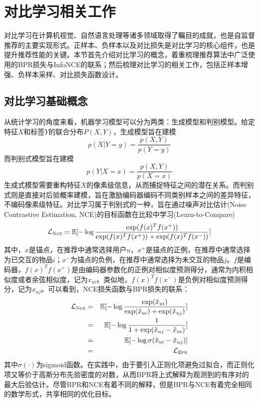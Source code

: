 \section{对比学习相关工作}
对比学习在计算机视觉、自然语言处理等诸多领域取得了瞩目的成就，也是自监督推荐的主要实现形式\cite{SSR:2023:TKDE}。正样本、负样本以及对比损失是对比学习的核心组件，也是提升推荐性能的关键。本节首先介绍对比学习的概念，着重梳理推荐算法中广泛使用的BPR损失与InfoNCE的联系；然后梳理对比学习的相关工作，包括正样本增强、负样本采样、对比损失函数设计。
\subsection{对比学习基础概念}
从统计学习的角度来看，机器学习模型可以分为两类：生成模型和判别模型\cite{li:2019}。给定特征$X$和标签$Y$的联合分布$P(X,Y)$，生成模型旨在建模
\[p(X|Y=y)= \frac{p(X,Y)}{p(Y=y)}\]
而判别式模型旨在建模
\[p(Y|X=x)= \frac{p(X,Y)}{p(X=x)}\]
生成式模型需要重构特征$X$的像素级信息，从而捕捉特征之间的潜在关系。而判别式则是直接对后验概率建模，旨在激励编码器编码不同类别样本之间的差异特征，不编码像素级特征。对比学习属于判别式的一种，旨在通过噪声对比估计(Noise Contrastive Estimation, NCE)\cite{Gutmann:2010:ICAIS}的目标函数在比较中学习(Learn-to-Compare)
\begin{eqnarray}
\mathcal{L}_\textsc{Nce} = \mathbb E[-\log \frac{\exp(f(x)^Tf(x^+))}{\exp(f(x)^Tf(x^+))+\exp(f(x)^Tf(x^-))}]
\end{eqnarray}
其中，$x$是锚点，在推荐中通常选择用户$u$，$x^+$是锚点的正例，在推荐中通常选择为已交互的物品$i$；$x^-$为锚点的负例，在推荐中通常选择为未交互的物品$j$。$f$是编码器，$f(x)^Tf(x^+)$是由编码器参数化的正例对相似度预测得分，通常为内积相似度或者余弦相似度，记为$\hat{x}_{ui}$。类似地，$f(x)^Tf(x^-)$是负例对相似度预测得分，记为$\hat{x}_{uj}$。可以看到，NCE损失函数与BPR损失\cite{Steffen:2009:UAI}的联系：
\begin{eqnarray}
	\mathcal{L}_\textsc{Nce} 
	&=& \mathbb E[-\log\frac{\exp(\hat{x}_{ui})}{\exp(\hat{x}_{ui})+\exp(\hat{x}_{uj})}]\nonumber \\
	&=& \mathbb E[-\log\frac{1}{1+\exp(\hat{x}_{uj}-\hat{x}_{ui})}]\nonumber \\
	&=& \mathbb E[-\log \sigma (\hat{x}_{ui} - \hat{x}_{uj})]\nonumber \\
	&=& \mathcal{L}_\textsc{Bpr} 
\end{eqnarray}
其中$\sigma(\cdot)$为sigmoid函数。在实践中，由于要引入正则化项避免过拟合，而正则化项又等价于高斯分布先验密度的对数，从而BPR将上式解释为观测到的有序对的最大后验估计。尽管BPR和NCE有着不同的解释，但是BPR与NCE有着完全相同的数学形式，共享相同的优化目标。

